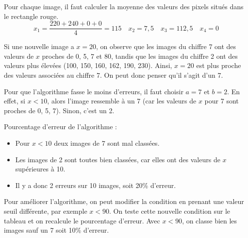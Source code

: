 \begin{MADenumerate}
			\item Pour chaque image, il faut calculer la moyenne des valeurs des pixels situés dans le rectangle rouge.
			$$x_1 = \frac{220+240+0+0}{4} = 115 \quad x_2 = 7,5 \quad x_3  = 112,5 \quad x_4  = 0$$
			\item Si une nouvelle image a $x=20$, on observe que les images du chiffre 7 ont des valeurs de $x$ proches de 0, 5, 7 et 80, tandis que les images du chiffre 2 ont des valeurs plus élevées (100, 150, 160, 162, 190, 230). Ainsi, $x=20$ est plus proche des valeurs associées au chiffre 7. On peut donc penser qu'il s'agit d'un 7.
			\item Pour que l'algorithme fasse le moins d'erreurs, il faut choisir $a=7$ et $b=2$. En effet, si $x<10$, alors l'image ressemble à un 7 (car les valeurs de $x$ pour 7 sont proches de 0, 5, 7). Sinon, c'est un 2.
			\item Pourcentage d'erreur de l'algorithme :
			\begin{itemize}
				\item Pour $x<10$ deux images de 7 sont mal classées.
				\item Les images de 2 sont toutes bien classées, car elles ont des valeurs de $x$ supérieures à 10.

				\item Il y a donc 2 erreurs sur 10 images, soit 20\% d'erreur.
			\end{itemize}
			\item Pour améliorer l'algorithme, on peut modifier la condition en prenant une valeur seuil différente, par exemple $x<90$. On teste cette nouvelle condition sur le tableau et on recalcule le pourcentage d'erreur. Avec $x<90$, on classe bien les images sauf un 7 soit 10\% d'erreur.
		\end{MADenumerate}
